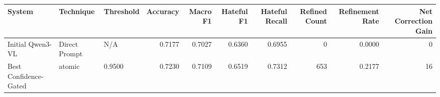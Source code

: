 \begin{tabular}{lllrrrrrrr}
\toprule
System & Technique & Threshold & Accuracy & Macro F1 & Hateful F1 & Hateful Recall & Refined Count & Refinement Rate & Net Correction Gain \\
\midrule
Initial Qwen3-VL & Direct Prompt & N/A & 0.7177 & 0.7027 & 0.6360 & 0.6955 & 0 & 0.0000 & 0 \\
Best Confidence-Gated & atomic & 0.9500 & 0.7230 & 0.7109 & 0.6519 & 0.7312 & 653 & 0.2177 & 16 \\
\bottomrule
\end{tabular}
